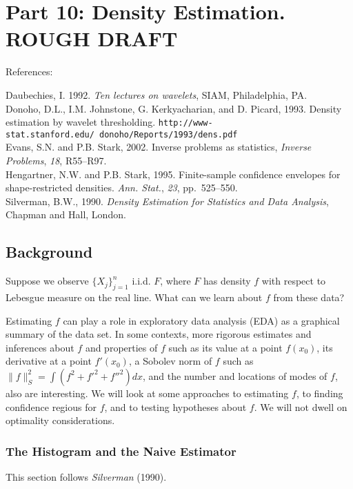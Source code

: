 \date{DRAFT--Revised 1 May 2008}



\section{Part 10: Density Estimation. ROUGH DRAFT}
References:

\noindent
Daubechies, I. 1992. {\em Ten lectures on wavelets\/}, SIAM, Philadelphia, PA.
\\[.1in]
Donoho, D.L., I.M. Johnstone, G. Kerkyacharian, and D. Picard, 1993.
Density estimation by wavelet thresholding.
{\tt http://www-stat.stanford.edu/~donoho/Reports/1993/dens.pdf\/}
\\[.1in]
Evans, S.N. and P.B. Stark, 2002. Inverse problems as statistics,
{\em Inverse Problems\/}, {\em 18\/}, R55--R97.
\\[.1in]
Hengartner, N.W. and P.B. Stark, 1995. Finite-sample confidence envelopes for
shape-restricted densities.
{\em Ann. Stat.\/}, {\em 23\/}, pp.~525--550.
\\[.1in]
Silverman, B.W., 1990. {\em Density Estimation for Statistics and Data Analysis\/},
Chapman and Hall, London.
\\[.1in]

\subsection{Background}
Suppose we observe $\{X_j\}_{j=1}^n$ i.i.d. $F$, where $F$ has density $f$ with respect
to Lebesgue measure on the real line.
What can we learn about $f$ from these data?

Estimating $f$ can play a role in exploratory data analysis (EDA)
as a graphical summary of the data set.
In some contexts, more rigorous
estimates and inferences about $f$ and properties of $f$ such as
its value at a point $f(x_0)$, its derivative
at a point $f'(x_0)$, a Sobolev norm of $f$ such as
$\|f\|_S^2 = \int (f^2 + f'^2 + f''^2)dx$,
and the number and locations of modes of $f$,
also are interesting.
We will look at some approaches to estimating $f$, to finding confidence regious
for $f$, and to testing hypotheses
about $f$.
We will not dwell on optimality considerations.

\subsubsection{The Histogram and the Naive Estimator}
This section follows {\em Silverman\/} (1990).

